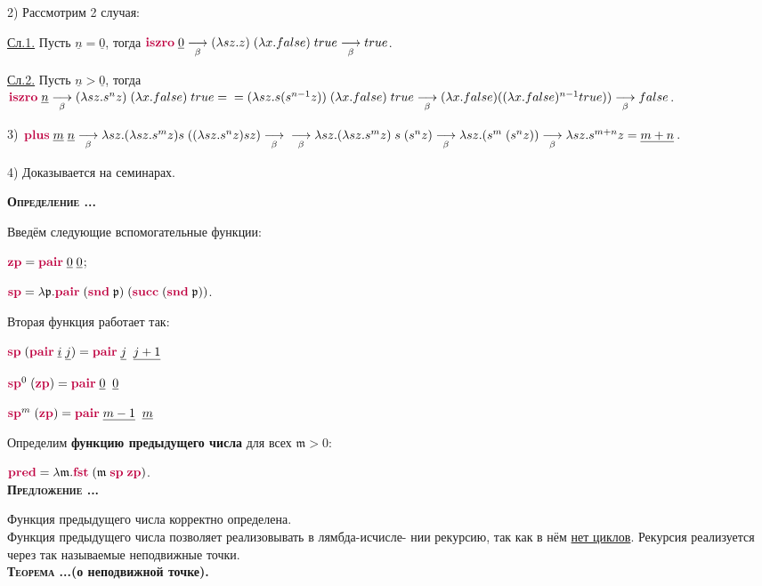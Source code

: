 \documentclass[18pt, a4paper]{extarticle}
\newcounter{par}
\newcounter{spar}
\newcounter{zap}
\newcommand{\opr}{\textbf{\textsc{Определение \thepar.\if\thespar1\thespar.\fi\thezap.\;}}\stepcounter{zap}}
\newcommand{\predl}{\textbf{\textsc{Предложение \thepar.\if\thespar1\thespar.\fi\thezap.\;}}\stepcounter{zap}}
\newcommand{\teorT}[1]{\textbf{\textsc{Теорема \thepar.\if\thespar1\thespar.\fi\thezap.}(#1).}\stepcounter{zap}}
\newcommand{\msM}{\mathfrak{m}}
\newcommand{\msP}{\mathfrak{p}}
\newcommand{\mzero}{\mathfrak{0}}
\newcommand{\lm}{\lambda}
\newcommand{\redb}{\underset{\beta}{\longrightarrow}}
\newcommand{\lfunction}[1]{\textcolor{purple}{\textbf{#1}}}
\newcommand{\churchnum}[1]{{\underline{#1}}}
\begin{document}
2) Рассмотрим 2 случая:

\underline{Сл.1.} Пусть $\churchnum{n} = \churchnum{0}$, тогда $\lfunction{iszro}\;\churchnum{0}\redb (\lm sz.z)\;(\lm x.false)\;true\redb true$.

\underline{Сл.2.} Пусть $\churchnum{n}>\churchnum{0}$, тогда $\lfunction{iszro}\;\churchnum{n}\redb (\lm sz.s^nz)\;(\lm x.false)\;true=\newline=(\lm sz.s(s^{n-1}z))\;(\lm x.false)\;true\redb (\lm x.false)((\lm x.false)
^{n-1}true))\redb false$.

3) $\lfunction{plus}\;\churchnum{m}\;\churchnum{n}\redb\lm sz.(\lm sz.s^mz)s\;((\lm sz.s^nz)sz)\redb\newline\redb\lm sz.(\lm sz.s^mz)\;s\;(s^nz)\redb\lm sz.(s^m\;(s^nz))\redb\lm sz.s^{m + n}z=\churchnum{m + n}$.

4) Доказывается на семинарах.

\opr

Введём следующие вспомогательные функции:

$\lfunction{zp}=\lfunction{pair}\;\churchnum{0}\;\churchnum{0}$;

$\lfunction{sp}=\lm\msP .\lfunction{pair}\;(\lfunction{snd}\;\msP)\;(\lfunction{succ}\;(\lfunction{snd}\;\msP))$.

Вторая функция работает так:

$\lfunction{sp}\;(\lfunction{pair}\;\churchnum{i}\;\churchnum{j}) = \lfunction{pair}\;\churchnum{j}\;\;\churchnum{j + 1}$

$\lfunction{sp}^0\;(\lfunction{zp})=\lfunction{pair}\;\churchnum{0}\;\;\churchnum{0}$

$\lfunction{sp}^m\;(\lfunction{zp})=\lfunction{pair}\;\churchnum{m - 1}\;\;\churchnum{m}$

Определим \textbf{функцию предыдущего числа} для всех $\msM >\mzero$:

$\lfunction{pred}=\lm \msM .\lfunction{fst}\;(\msM\;\lfunction{sp}\;\lfunction{zp})$.\\

\predl

Функция предыдущего числа корректно определена.\\

Функция предыдущего числа позволяет реализовывать в лямбда-исчисле- нии рекурсию, так как в нём \underline{нет циклов}. Рекурсия реализуется через так называемые неподвижные точки.\\

\teorT{о неподвижной точке}
\end{document}
